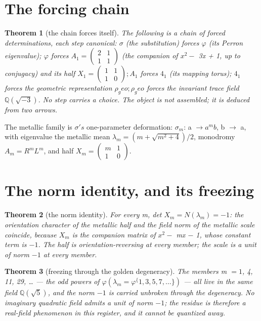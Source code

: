 \documentclass[11pt]{article}
\theoremstyle{plain}
\newtheorem{theorem}{Theorem}[section]
\theoremstyle{definition}
\theoremstyle{remark}
\begin{document}
\section{The forcing chain}

\begin{theorem}[the chain forces itself]
The following is a chain of forced determinations, each step canonical: \(\sigma \) (the substitution) forces \(\varphi \) (its Perron eigenvalue); \(\varphi \) forces \(A_{1} = \left(\begin{smallmatrix}2 & 1\\1 & 1\end{smallmatrix}\right)\) (the companion of \(x^{2} -\) 3x + 1, up to conjugacy) and its half \(X_{1} = \left(\begin{smallmatrix}1 & 1\\1 & 0\end{smallmatrix}\right); A_{1}\) forces \(4_{1}\) (its mapping torus); \(4_{1}\) forces the geometric representation \(\rho _{g}eo; \rho _{g}eo\) forces the invariant trace field \(\mathbb{Q}(\sqrt{-3})\). No step carries a choice. The object is not assembled; it is deduced from two arrows.
\end{theorem}

The metallic family is \(\sigma 's\) one-parameter deformation: \(\sigma _{m}\): a \(\to  a^{m}b\), b \(\to \) a, with eigenvalue the metallic mean \(\lambda _{m} = (m + \sqrt{m^{2}+4})/2\), monodromy \(A_{m} = R^{m} L^{m}\), and half \(X_{m} = \left(\begin{smallmatrix}m & 1\\1 & 0\end{smallmatrix}\right)\).

\section{The norm identity, and its freezing}

\begin{theorem}[the norm identity]
For every m, det \(X_{m} = N(\lambda _{m}) = -1\): the orientation character of the metallic half and the field norm of the metallic scale coincide, because \(X_{m}\) is the companion matrix of \(x^{2} -\) mx \(-\) 1, whose constant term is \(-1\). The half is orientation-reversing at every member; the scale is a unit of norm \(-1\) at every member.
\end{theorem}

\begin{theorem}[freezing through the golden degeneracy]
The members m \(= 1\), 4, 11, 29, … — the odd powers of \(\varphi  (\lambda _{m} = \varphi ^\{1,3,5,7,…\})\) — all live in the same field \(\mathbb{Q}(\sqrt{5})\), and the norm \(-1\) is carried unbroken through the degeneracy. No imaginary quadratic field admits a unit of norm \(-1\); the residue is therefore a real-field phenomenon in this register, and it cannot be quantized away.
\end{theorem}
\end{document}

